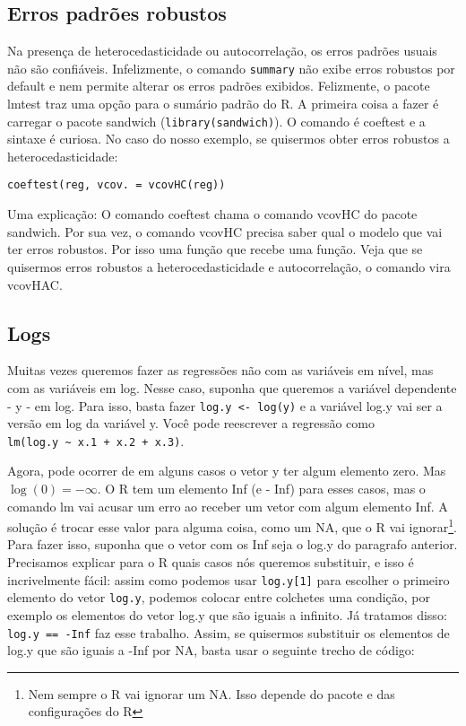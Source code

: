 \documentclass[
]{book}
\begin{document}
\hypertarget{erros-padruxf5es-robustos}{%
\subsection{Erros padrões robustos}\label{erros-padruxf5es-robustos}}

Na presença de heterocedasticidade ou autocorrelação, os erros padrões usuais não são confiáveis. Infelizmente, o comando \texttt{summary} não exibe erros robustos por default e nem permite alterar os erros padrões exibidos. Felizmente, o pacote lmtest traz uma opção para o sumário padrão do R. A primeira coisa a fazer é carregar o pacote sandwich (\texttt{library(sandwich)}). O comando é coeftest e a sintaxe é curiosa. No caso do nosso exemplo, se quisermos obter erros robustos a heterocedasticidade:

\begin{verbatim}
coeftest(reg, vcov. = vcovHC(reg))
\end{verbatim}

Uma explicação: O comando coeftest chama o comando vcovHC do pacote sandwich. Por sua vez, o comando vcovHC precisa saber qual o modelo que vai ter erros robustos. Por isso uma função que recebe uma função. Veja que se quisermos erros robustos a heterocedasticidade e autocorrelação, o comando vira vcovHAC.

\hypertarget{logs}{%
\subsection{Logs}\label{logs}}

Muitas vezes queremos fazer as regressões não com as variáveis em nível, mas com as variáveis em log. Nesse caso, suponha que queremos a variável dependente - y - em log. Para isso, basta fazer \texttt{log.y\ \textless{}-\ log(y)} e a variável log.y vai ser a versão em log da variável y. Você pode reescrever a regressão como \texttt{lm(log.y\ \textasciitilde{}\ x.1\ +\ x.2\ +\ x.3)}.

Agora, pode ocorrer de em alguns casos o vetor y ter algum elemento zero. Mas \(\log(0) = -\infty\). O R tem um elemento Inf (e - Inf) para esses casos, mas o comando lm vai acusar um erro ao receber um vetor com algum elemento Inf. A solução é trocar esse valor para alguma coisa, como um NA, que o R vai ignorar\footnote{Nem sempre o R vai ignorar um NA. Isso depende do pacote e das configurações do R}. Para fazer isso, suponha que o vetor com os Inf seja o log.y do paragrafo anterior. Precisamos explicar para o R quais casos nós queremos substituir, e isso é incrivelmente fácil: assim como podemos usar \texttt{log.y{[}1{]}} para escolher o primeiro elemento do vetor \texttt{log.y}, podemos colocar entre colchetes uma condição, por exemplo os elementos do vetor log.y que são iguais a infinito. Já tratamos disso: \texttt{log.y\ ==\ -Inf} faz esse trabalho. Assim, se quisermos substituir os elementos de log.y que são iguais a -Inf por NA, basta usar o seguinte trecho de código:
\end{document}
